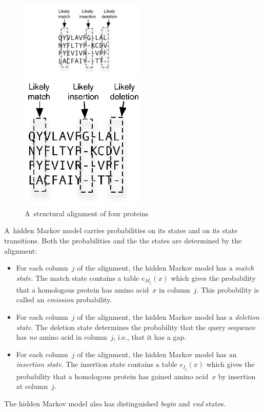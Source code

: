 \documentclass[preprint,nonatbib,blockstyle,nocopyrightspace,times]{sigplanconf}
\begin{document}
\begin{figure}
\ifpdfmadness
\centerline{\includegraphics[width=6cm]{alignment.pdf}} 
\else
\centerline{\includegraphics[width=6cm]{alignment.eps}} 
\fi



\caption{A~structural alignment of four proteins}
\label{alignment} 
\end{figure}

A~hidden Markov model carries probabilities on its states and on its
state transitions.
Both the probabilities and the
the states are determined by the alignment:
\begin{itemize}
\item
For each column~$j$ of the alignment, the hidden Markov model has a
\emph{match state}.
The match state contains a table $e_{M_j}(x)$ which gives the
 probability that a homologous protein has amino acid~$x$ in
 column~$j$.
This probability is called an \emph{emission} probability.
\item
For each column~$j$ of the alignment, the hidden Markov model has a
\emph{deletion state}.
The deletion state determines the probability that the query sequence
has \emph{no} amino acid  in column~$j$, i.e., that it has a gap.
\item 
For each column~$j$ of the alignment, the hidden Markov model has an
\emph{insertion state}.
The insertion state contains a table $e_{I_j}(x)$ which gives the
probability that a homologous protein has gained amino acid~$x$ by
insertion at column~$j$.
\end{itemize}
The hidden Markov model also has distinguished \emph{begin} and \emph{end} states.
\end{document}
